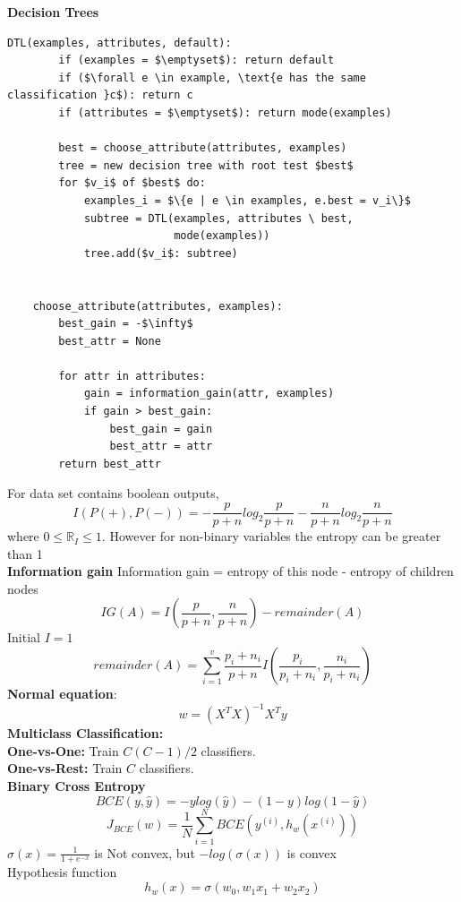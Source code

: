 \documentclass[8pt,twocolumn]{article}
\begin{document}
\vspace{-0.6em}
\textbf{Decision Trees}\vspace{-0.6em}
\begin{lstlisting}[mathescape=true]
    DTL(examples, attributes, default):
        if (examples = $\emptyset$): return default
        if ($\forall e \in example, \text{e has the same classification }c$): return c
        if (attributes = $\emptyset$): return mode(examples)

        best = choose_attribute(attributes, examples)
        tree = new decision tree with root test $best$
        for $v_i$ of $best$ do:
            examples_i = $\{e | e \in examples, e.best = v_i\}$
            subtree = DTL(examples, attributes \ best, 
                          mode(examples))
            tree.add($v_i$: subtree)


    choose_attribute(attributes, examples):
        best_gain = -$\infty$
        best_attr = None
    
        for attr in attributes:
            gain = information_gain(attr, examples)
            if gain > best_gain:
                best_gain = gain
                best_attr = attr
        return best_attr
    \end{lstlisting}\vspace{-0.6em}
    For data set contains boolean outputs, 
    \[I(P(+), P(-)) = -\frac{p}{p + n}log_2 \frac{p}{p + n} - \frac{n}{p+n}log_2\frac{n}{p+n}\]
    where $0 \leq \mathbb{R}_I \leq 1$. However for non-binary variables the entropy can be greater than 1\\
    \textbf{Information gain}
    Information gain = entropy of this node - entropy of children nodes
    \[IG(A) = I(\frac{p}{p + n}, \frac{n}{p + n}) - remainder(A)\] Initial $I = 1$
    \[remainder(A) = \sum_{i=1}^{v}\frac{p_i + n_i}{p + n}I(\frac{p_i}{p_i + n_i}, \frac{n_i}{p_i + n_i})\]
\textbf{Normal equation}:\vspace{-0.6em}
\[w = (X^T X)^{-1} X^T y\]
\textbf{Multiclass Classification:}\\
\textbf{One-vs-One:} Train $C(C-1)/2$ classifiers.\\
\textbf{One-vs-Rest:} Train $C$ classifiers.\\
\textbf{Binary Cross Entropy}
\[BCE(y, \hat{y}) = -ylog(\hat{y}) - (1 - y)log(1 - \hat{y})\]
\[J_{BCE}(w) = \frac{1}{N} \sum_{i=1}^{N} BCE(y^{(i)}, h_w(x^{(i)}))\]
$\sigma(x) = \frac{1}{1 + e^{-x}}$ is Not convex, but
$-log(\sigma(x))$ is convex\\
Hypothesis function
\[h_w(x) = \sigma(w_0, w_1 x_1 + w_2 x_2) \]
\end{document}
